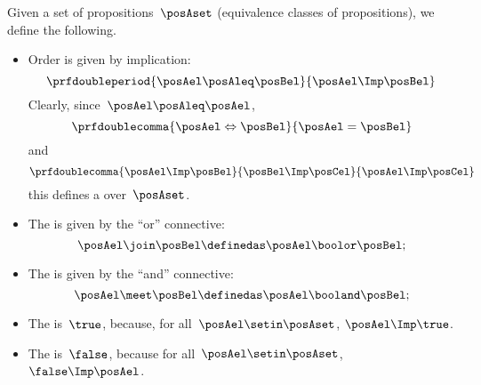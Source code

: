 \begin{ctdefinition}
    \label{def:prop-as-lattice}
    Given a set of propositions~$\posAset$ (equivalence classes of propositions), we define the following.
    \begin{itemize}
        \item Order is given by implication:
              \begin{equation}
                  \prfdoubleperiod{
                      \posAel\posAleq \posBel
                  }{
                      \posAel \Imp \posBel
                  }
              \end{equation}
              Clearly, since~$\posAel \posAleq \posAel$,
              \begin{equation}
                  \prfdoublecomma{
                      \posAel \Leftrightarrow \posBel
                  }{
                      \posAel =\posBel
                  }
              \end{equation}
              and
              \begin{equation}
                  \prfdoublecomma{
                      \posAel \Imp \posBel
                  }{
                      \posBel \Imp \posCel
                  }{
                      \posAel \Imp \posCel
                  }
              \end{equation}
              this defines a  over~$\posAset$.
        \item The  is given by the ``or'' connective:
              \begin{equation}
                  \posAel \join \posBel \definedas \posAel \boolor \posBel;
              \end{equation}
        \item The  is given by the ``and'' connective:
              \begin{equation}
                  \posAel \meet \posBel \definedas \posAel \booland \posBel;
              \end{equation}
        \item The  is~$\true$,
              because, for all~$\posAel\setin \posAset$, $\posAel \Imp \true$.
        \item The  is~$\false$, because for all~$\posAel\setin \posAset$, $\false \Imp \posAel$.
    \end{itemize}
\end{ctdefinition}
\begin{marginfigure}
    \centering
    \caption{}
    \label{fig:prod_coprod_prop}
\end{marginfigure}


